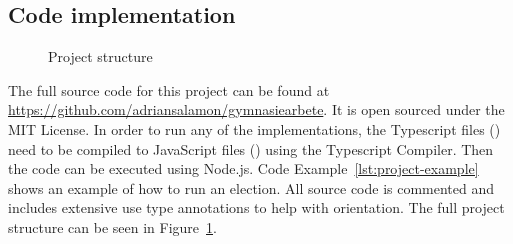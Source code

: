 \documentclass[12pt]{article}
\begin{document}
\printbibliography[
heading=bibintoc,
title={References}
]
\pagebreak
\begin{appendices}
\section{Code implementation}
\label{sec:conde implementation}
\begin{figure}[H]
\caption{Project structure}
\label{fig:project-structure}
\end{figure}
The full source code for this project can be found at \url{https://github.com/adriansalamon/gymnasiearbete}. It is open sourced under the MIT License. In order to run any of the implementations, the Typescript files () need to be compiled to JavaScript files () using the Typescript Compiler. Then the code can be executed using Node.js. Code Example~\ref{lst:project-example} shows an example of how to run an election.
All source code is commented and includes extensive use type annotations to help with orientation. The full project structure can be seen in Figure~\ref{fig:project-structure}.


\end{appendices}
\end{document}
